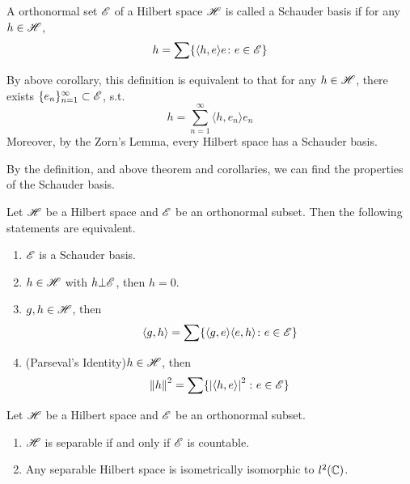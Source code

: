\documentclass[a4paper,11pt]{report}
\begin{document}
\begin{defn}
	A orthonormal set $\mathscr{E}$ of a Hilbert space $\mathscr{H}$ is called a Schauder basis if for any $h \in \mathscr{H}$,
	\begin{equation*}
		h = \sum \{ \langle h,e \rangle e \colon e \in \mathscr{E}\}
	\end{equation*}
\end{defn}
\begin{rem}
	By above corollary, this definition is equivalent to that for any $h \in \mathscr{H}$, there exists $\{e_n\}_{n=1}^{\infty} \subset \mathscr{E}$, s.t.
	\begin{equation*}
		h = \sum_{n=1}^{\infty}  \langle h,e_n \rangle e_n
	\end{equation*}
	Moreover, by the Zorn's Lemma, every Hilbert space has a Schauder basis.
\end{rem}

By the definition, and above theorem and corollaries, we can find the properties of the Schauder basis.
\begin{thm}
	Let $\mathscr{H}$ be a Hilbert space and $\mathscr{E}$ be an orthonormal subset. Then the following statements are equivalent.
	\begin{enumerate}[label=\arabic*)]
		\item $\mathscr{E}$ is a Schauder basis.
		\item $h \in \mathscr{H}$ with $h \bot \mathscr{E}$, then $h=0$.
		\item $g,h \in \mathscr{H}$, then
			\begin{equation*}
				 \langle g,h \rangle  = \sum \{ \langle g,e \rangle  \langle e,h \rangle  \colon e \in \mathscr{E}\}
			\end{equation*}
		\item (Parseval's Identity)$h \in \mathscr{H}$, then
			\begin{equation*}
				\left\lVert h\right\lVert^{2} = \sum \{\left\lvert \langle h,e \rangle \right\lvert^{2} \colon e \in \mathscr{E}\}
			\end{equation*}
	\end{enumerate}
\end{thm}

\begin{prop}
	Let $\mathscr{H}$ be a Hilbert space and $\mathscr{E}$ be an orthonormal subset.
	\begin{enumerate}[label=\arabic*)]
		\item $\mathscr{H}$ is separable if and only if $\mathscr{E}$ is countable.
		\item Any separable Hilbert space is isometrically isomorphic to $l^{2}(\mathbb{C})$.
	\end{enumerate}
\end{prop}
\end{document}
